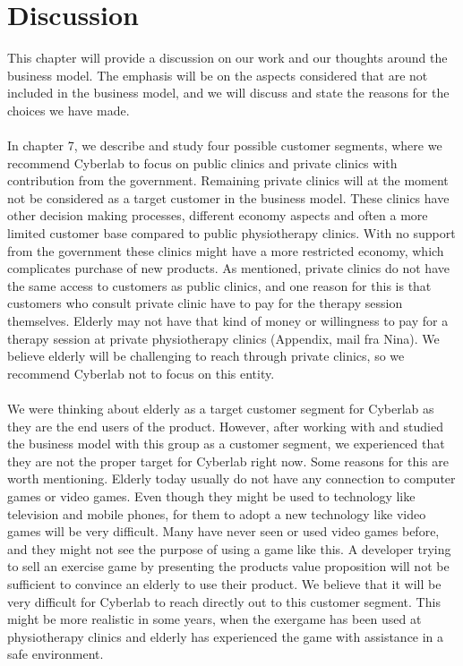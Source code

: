 \chapter{Discussion}
This chapter will provide a discussion on our work and our thoughts around the business model. The emphasis will be on the aspects considered that are not included in the business model, and we will discuss and state the reasons for the choices we have made.  \\ \\
In chapter 7, we describe and study four possible customer segments, where we recommend Cyberlab to focus on public clinics and private clinics with contribution from the government. Remaining private clinics will at the moment not be considered as a target customer in the business model. These clinics have other decision making processes, different economy aspects and often a more limited customer base compared to public physiotherapy clinics. With no support from the government these clinics might have a more restricted economy, which complicates purchase of new products. As mentioned, private clinics do not have the same access to customers as public clinics, and one reason for this is that customers who consult private clinic have to pay for the therapy session themselves. Elderly may not have that kind of money or willingness to pay for a therapy session at private physiotherapy clinics (Appendix, mail fra Nina). We believe elderly will be challenging to reach through private clinics, so we recommend Cyberlab not to focus on this entity. \\ \\
We were thinking about elderly as a target customer segment for Cyberlab as they are the end users of the product. However, after working with and studied the business model with this group as a customer segment, we experienced that they are not the proper target for Cyberlab right now. Some reasons for this are worth mentioning. Elderly today usually do not have any connection to computer games or video games. Even though they might be used to technology like television and mobile phones, for them to adopt a new technology like video games will be very difficult. Many have never seen or used video games before, and they might not see the purpose of using a game like this. A developer trying to sell an exercise game by presenting the products value proposition will not be sufficient to convince an elderly to use their product. We believe that it will be very difficult for Cyberlab to reach directly out to this customer segment. This might be more realistic in some years, when the exergame has been used at physiotherapy clinics and elderly has experienced the game with assistance in a safe environment.\\ \\
